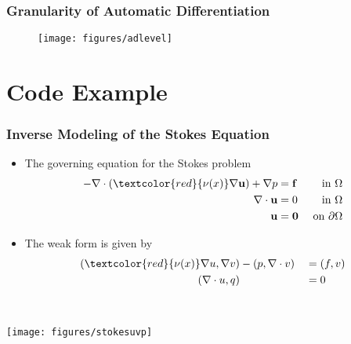 \documentclass[usenames,dvipsnames]{beamer}
\begin{document}
\begin{frame}
	\frametitle{Granularity of Automatic Differentiation}
	
	
	\begin{figure}[hbt]
		\centering
		\texttt{[image: figures/adlevel]}
	\end{figure}
	
	
	
\end{frame}


\section{Code Example}


\begin{frame}
	\frametitle{Inverse Modeling of the Stokes Equation}
	
	\begin{itemize}
		\item The governing equation for the Stokes problem
			$$\begin{aligned} -\nabla \cdot (\textcolor{red}{\nu(x)}\nabla \mathbf{u}) + \nabla p &= \mathbf{f} & \text{ in } \Omega \\ \nabla \cdot \mathbf{u} &= 0 & \text{ in } \Omega \\ \mathbf{u} &= \mathbf{0} & \text{ on } \partial \Omega \end{aligned}$$
	\end{itemize}


\begin{minipage}[c]{0.7\textwidth}
\begin{itemize}
	\item The weak form is given by 
	\begin{equation*}
		\begin{aligned}
			(\textcolor{red}{\nu(x)} \nabla u, \nabla v) &- (p, \nabla \cdot v) &&= (f, v)\\
			(\nabla \cdot u, q) & &&= 0
		\end{aligned}
	\end{equation*}
\end{itemize}
\end{minipage}~
\begin{minipage}[c]{0.29\textwidth}
	\texttt{[image: figures/stokesuvp]}
\end{minipage}


\end{frame}
\end{document}
